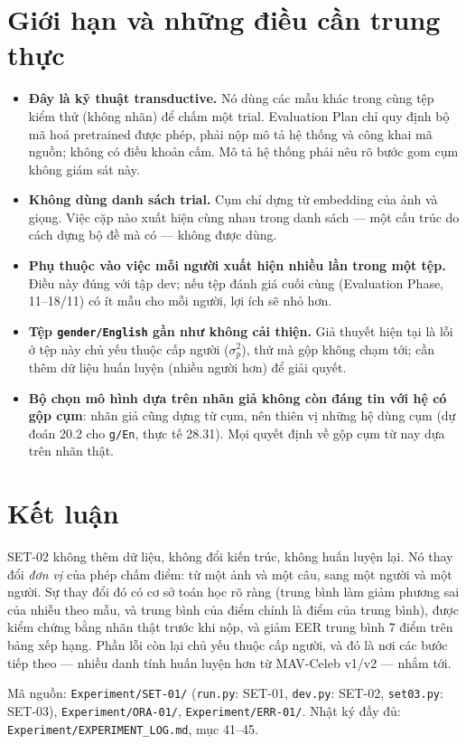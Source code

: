 \documentclass[11pt,a4paper]{article}
\newcommand{\key}[1]{\textbf{\color{accent}#1}}
\begin{document}
\section{Giới hạn và những điều cần trung thực}

\begin{itemize}[leftmargin=1.5em,itemsep=3pt]
\item \key{Đây là kỹ thuật transductive.} Nó dùng các mẫu khác trong cùng tệp kiểm thử (không nhãn) để chấm một trial. Evaluation Plan chỉ quy định bộ mã hoá pretrained được phép, phải nộp mô tả hệ thống và công khai mã nguồn; không có điều khoản cấm. Mô tả hệ thống phải nêu rõ bước gom cụm không giám sát này.
\item \key{Không dùng danh sách trial.} Cụm chỉ dựng từ embedding của ảnh và giọng. Việc cặp nào xuất hiện cùng nhau trong danh sách --- một cấu trúc do cách dựng bộ đề mà có --- không được dùng.
\item \key{Phụ thuộc vào việc mỗi người xuất hiện nhiều lần trong một tệp.} Điều này đúng với tập dev; nếu tệp đánh giá cuối cùng (Evaluation Phase, 11--18/11) có ít mẫu cho mỗi người, lợi ích sẽ nhỏ hơn.
\item \key{Tệp \texttt{gender/English} gần như không cải thiện.} Giả thuyết hiện tại là lỗi ở tệp này chủ yếu thuộc cấp người ($\sigma_p^2$), thứ mà gộp không chạm tới; cần thêm dữ liệu huấn luyện (nhiều người hơn) để giải quyết.
\item \key{Bộ chọn mô hình dựa trên nhãn giả không còn đáng tin với hệ có gộp cụm}: nhãn giả cũng dựng từ cụm, nên thiên vị những hệ dùng cụm (dự đoán 20.2 cho \texttt{g/En}, thực tế 28.31). Mọi quyết định về gộp cụm từ nay dựa trên nhãn thật.
\end{itemize}

\section{Kết luận}

SET-02 không thêm dữ liệu, không đổi kiến trúc, không huấn luyện lại. Nó thay đổi \emph{đơn vị} của phép chấm điểm: từ một ảnh và một câu, sang một người và một người. Sự thay đổi đó có cơ sở toán học rõ ràng (trung bình làm giảm phương sai của nhiễu theo mẫu, và trung bình của điểm chính là điểm của trung bình), được kiểm chứng bằng nhãn thật trước khi nộp, và giảm EER trung bình 7 điểm trên bảng xếp hạng. Phần lỗi còn lại chủ yếu thuộc cấp người, và đó là nơi các bước tiếp theo --- nhiều danh tính huấn luyện hơn từ MAV-Celeb v1/v2 --- nhắm tới.

\vspace{1em}
{\small\color{muted} Mã nguồn: \texttt{Experiment/SET-01/} (\texttt{run.py}: SET-01, \texttt{dev.py}: SET-02, \texttt{set03.py}: SET-03), \texttt{Experiment/ORA-01/}, \texttt{Experiment/ERR-01/}. Nhật ký đầy đủ: \texttt{Experiment/EXPERIMENT\_LOG.md}, mục 41--45.}
\end{document}
